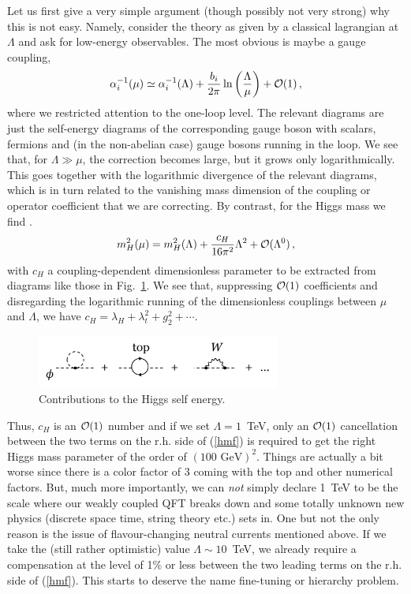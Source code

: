 \documentclass[12pt]{article}
\newcommand{\be}{\begin{equation}}
\newcommand{\ee}{\end{equation}}
\numberwithin{equation}{section}
\begin{document}
Let us first give a very simple argument (though possibly not very strong) why this is not easy. Namely, consider the theory as given by a classical lagrangian at $\Lambda$ and ask for low-energy observables. The most obvious is maybe a gauge coupling,
\be
\alpha_i^{-1}(\mu)\simeq \alpha_i^{-1}(\Lambda)+\frac{b_i}{2\pi}\ln\left(\frac{\Lambda}{\mu}\right)+{\cal O}(1)\,,
\ee
where we restricted attention to the one-loop level. The relevant diagrams are just the self-energy diagrams of the corresponding gauge boson with scalars, fermions and (in the non-abelian case) gauge bosons running in the loop. We see that, for $\Lambda\gg\mu$, the correction becomes large, but it grows only logarithmically. This goes together with the logarithmic divergence of the relevant diagrams, which is in turn related to the vanishing mass dimension of the coupling or operator coefficient that we are correcting. By contrast, for the Higgs mass we find
\cite{Gildener:1976ai, Veltman:1980mj}.
\be
m_H^2(\mu)=m_H^2(\Lambda)+\frac{c_H}{16\pi^2}\Lambda^2+{\cal O}(\Lambda^0)\,,
\label{hmf}
\ee
with $c_H$ a coupling-dependent dimensionless parameter to be extracted from diagrams like those in Fig.~\ref{hse}. We see that, suppressing ${\cal O}(1)$ coefficients and disregarding the logarithmic running of the dimensionless couplings between $\mu$ and $\Lambda$, we have $c_H=\lambda_H+\lambda_t^2+g_2^2+\cdots$.

\begin{figure}[ht]
\begin{center} 
\includegraphics[width=8cm]{hse.png}
\caption{Contributions to the Higgs self energy.}
\label{hse} 
\end{center}
\end{figure}

Thus, $c_H$ is an ${\cal O}(1)$ number and if we set $\Lambda=1$~TeV, only an ${\cal O}(1)$ cancellation between the two terms on the r.h. side of (\ref{hmf}) is required to get the right Higgs mass parameter of the order of $(100\,\,\mbox{GeV})^2$. Things are actually a bit worse since there is a color factor of 3 coming with the top and other numerical factors. But, much more importantly, we can {\it not} simply declare 1~TeV to be the scale where our weakly coupled QFT breaks down and some totally unknown new physics (discrete space time, string theory etc.) sets in. One but not the only reason is the issue of flavour-changing neutral currents mentioned above. If we take the (still rather optimistic) value $\Lambda\sim 10$~TeV, we already require a compensation at the level of 1$\%$ or less between the two leading terms on the r.h. side of (\ref{hmf}). This starts to deserve the name fine-tuning or hierarchy problem.
\end{document}
